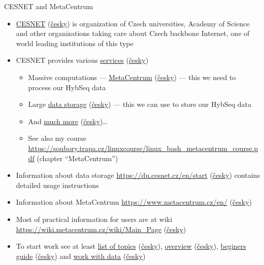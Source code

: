 \documentclass[compress, ucs, xelatex, 11pt, xcolor=x11names, aspectratio=169,
	hyperref={
		bookmarks=true,
		unicode=true,
		colorlinks=true,
		pdftitle={HybSeq course},
		plainpages=false,
		pdfauthor={Vojtech Zeisek},
		pdfsubject={Practical processing of HybSeq target enrichment sequencing data on computing grids like MetaCentrum},
		pdfcreator={XeLaTeX},
		pdfkeywords={BASH, command line, GNU, HybSeq, Linux, MetaCentrum, sequencing shell, target enrichment},
		linkcolor=Turquoise4, %
		anchorcolor=DodgerBlue4, %
		citecolor=DodgerBlue4, %
		filecolor=DodgerBlue4, %
		menucolor=Tan4, %
		urlcolor=DarkOliveGreen4, %
		pdftex},
	url={hyphens, lowtilde} %
	]{beamer}
\renewcommand{\alert}[1]{\textcolor{OrangeRed3}{#1}}
\begin{document}
\begin{frame}[allowframebreaks]{CESNET and MetaCentrum}
	\label{CESNET}
	\begin{itemize}
		\item \href{https://www.cesnet.cz/?lang=en}{CESNET} (\href{https://www.cesnet.cz/}{česky}) is organization of Czech universities, Academy of Science and other organizations taking care about Czech backbone Internet, one of world leading institutions of this type
		\item CESNET provides various \href{https://www.cesnet.cz/services/?lang=en}{services} (\href{https://www.cesnet.cz/sluzby/}{česky})
		\begin{itemize}
			\item Massive computations --- \href{https://www.cesnet.cz/services/massive-computations-metacentrum/?lang=en}{MetaCentrum} (\href{https://www.cesnet.cz/sluzby/metacentrum/}{česky}) --- \alert{this we need to process our HybSeq data}
			\item Large \href{https://www.cesnet.cz/services/data-storage/?lang=en}{data storage} (\href{https://www.cesnet.cz/sluzby/datova-uloziste/}{česky}) --- \alert{this we can use to store our HybSeq data}
			\item And \href{https://www.cesnet.cz/services/?lang=en}{much more} (\href{https://www.cesnet.cz/sluzby/}{česky})\ldots
			\item See also my course \url{https://soubory.trapa.cz/linuxcourse/linux_bash_metacentrum_course.pdf} (chapter \enquote{MetaCentrum})
		\end{itemize}
		\item Information about data storage \url{https://du.cesnet.cz/en/start} (\href{https://du.cesnet.cz/cs/start}{česky}) contains detailed usage instructions
		\item Information about MetaCentrum \url{https://www.metacentrum.cz/en/} (\href{https://www.metacentrum.cz/cs/}{česky})
		\item Most of practical information for users are at wiki \url{https://wiki.metacentrum.cz/wiki/Main_Page} (\href{https://wiki.metacentrum.cz/wiki/Hlavn\%C3\%AD_strana}{česky})
		\item To start work see at least \href{https://wiki.metacentrum.cz/wiki/Categorized_list_of_topics}{list of topics} (\href{https://wiki.metacentrum.cz/wiki/Rozcestnik}{česky}), \href{https://wiki.metacentrum.cz/wiki/Computational_services_overview}{overview} (\href{https://wiki.metacentrum.cz/wiki/Prehled_vypocetnich_sluzeb}{česky}), \href{https://wiki.metacentrum.cz/wiki/Beginners_guide}{beginers guide} (\href{https://wiki.metacentrum.cz/wiki/Pruvodce_pro_zacatecniky}{česky}) and \href{https://wiki.metacentrum.cz/wiki/Working_with_data}{work with data} (\href{https://wiki.metacentrum.cz/wiki/Prace_s_daty}{česky})

\end{itemize}
\end{frame}
\end{document}
